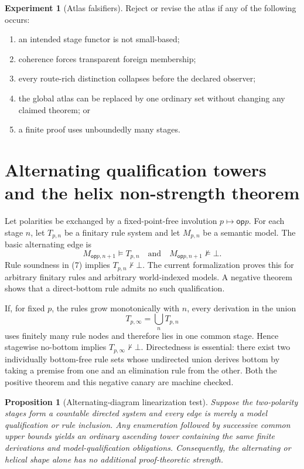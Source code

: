 \documentclass[11pt]{article}
\newtheorem{proposition}[theorem]{Proposition}
\theoremstyle{definition}
\newtheorem{experiment}[theorem]{Experiment}
\theoremstyle{remark}
\newcommand{\op}{\mathsf{op}}
\begin{document}
\begin{experiment}[Atlas falsifiers]
Reject or revise the atlas if any of the following occurs:
\begin{enumerate}[label=(\roman*)]
\item an intended stage functor is not small-based;
\item coherence forces transparent foreign membership;
\item every route-rich distinction collapses before the declared observer;
\item the global atlas can be replaced by one ordinary set without changing any
  claimed theorem; or
\item a finite proof uses unboundedly many stages.
\end{enumerate}
\end{experiment}

\section{Alternating qualification towers and the helix non-strength theorem}

Let polarities be exchanged by a fixed-point-free involution $p\mapsto\op p$.
For each stage $n$, let $T_{p,n}$ be a finitary rule system and let
$M_{p,n}$ be a semantic model.  The basic alternating edge is
\[
  M_{\op p,n+1}\models T_{p,n}
  \quad\text{and}\quad
  M_{\op p,n+1}\not\models\bot.                           \tag{7}
\]
Rule soundness in (7) implies $T_{p,n}\nvdash\bot$.  The current formalization
proves this for arbitrary finitary rules and arbitrary world-indexed models.  A
negative theorem shows that a direct-bottom rule admits no such qualification.

If, for fixed $p$, the rules grow monotonically with $n$, every derivation in the
union
\[
  T_{p,\infty}=\bigcup_n T_{p,n}
\]
uses finitely many rule nodes and therefore lies in one common stage.  Hence
stagewise no-bottom implies $T_{p,\infty}\nvdash\bot$.  Directedness is essential:
there exist two individually bottom-free rule sets whose undirected union derives
bottom by taking a premise from one and an elimination rule from the other.  Both
the positive theorem and this negative canary are machine checked.

\begin{proposition}[Alternating-diagram linearization test]
Suppose the two-polarity stages form a countable directed system and every
edge is merely a model qualification or rule inclusion.  Any enumeration followed
by successive common upper bounds yields an ordinary ascending tower containing
the same finite derivations and model-qualification obligations.  Consequently,
the alternating or helical shape alone has no additional proof-theoretic strength.
\end{proposition}
\end{document}
